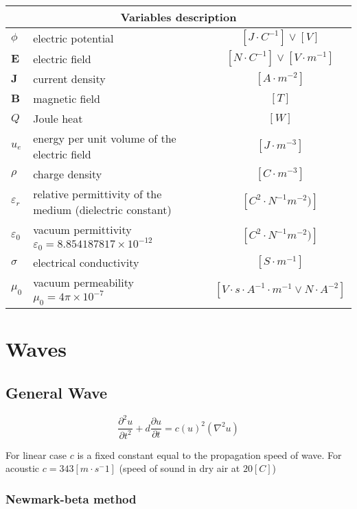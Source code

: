 \documentclass[a4paper,10pt]{book}
\begin{document}
\begin{tabular}{|l|p{6.7cm}|c|}
    \hline
    \multicolumn{3}{|c|}{Variables description} \\
    \hline
    $\phi$ & electric potential & $[J\cdot{C^{-1}}] \vee [V]$ \\
    $\mathbf E$ & electric field & $[N\cdot{C^{-1}}] \vee [V\cdot{m^{-1}}]$ \\
    $\mathbf J$ & current density & $[A\cdot{m^{-2}}]$ \\
    $\mathbf B$ & magnetic field & $[T]$ \\
    $Q$ & Joule heat & $[W]$ \\
    $u_e$ & energy per unit volume of the electric field & $[J\cdot{m^{-3}}]$ \\
    $\rho$ & charge density & $[C\cdot{m^{-3}}]$ \\
    $\varepsilon_r$ & relative permittivity of the medium (dielectric constant) & $[C^2\cdot{N^{-1}m^{-2}})]$ \\
    $\varepsilon_0$ & vacuum permittivity $\varepsilon_0 = 8.854187817\times10^{-12}$ & $[C^2\cdot{N^{-1}m^{-2}})]$ \\
    $\sigma$ & electrical conductivity & $[S\cdot{m^{-1}}]$ \\
    $\mu_0$ & vacuum permeability $\mu_0 = 4\pi\times10^{-7}$ & $[V{\cdot}s{\cdot}A^{-1}{\cdot}m^{-1} \vee N{\cdot}A^{-2}]$ \\
    \hline
\end{tabular}

\section{Waves}

\subsection{General Wave}

    \begin{equation}
    \frac{\partial^2u}{\partial{t}^2}+d\frac{\partial{u}}{\partial{t}}=
    {c(u)}^2\left(\nabla^2u\right)
    \end{equation}

    For linear case $c$ is a fixed constant equal to the propagation speed of wave. For acoustic $c=343 \left[m{\cdot}s^-1\right]$ (speed of sound in dry air at $20 \left[C\right]$)

\subsubsection{Newmark-beta method}
\end{document}
